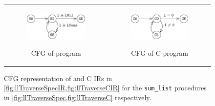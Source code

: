\begin{figure}
\begin{tabular}{@{}c@{}c@{}}
\begin{subfigure}[b]{0.5\textwidth}
\begin{center}
{\includegraphics[scale=1.4]{chapters/figures/figSumListSpecCfg.pdf}}
\end{center}
\caption{\label{fig:llTraverseSpecCFG}CFG of \SpecL{} program}
\end{subfigure}%
&
\begin{subfigure}[b]{0.5\textwidth}
\begin{center}
{\includegraphics[scale=1.4]{chapters/figures/figSumListCCfg.pdf}}
\end{center}
\caption{\label{fig:llTraverseCCFG}CFG of C program}
\end{subfigure}%
\\
\end{tabular}
\caption{\label{fig:llTraverseSpecAndCCFG}CFG representation of \SpecL{} and C IRs in \cref{fig:llTraverseSpecIR,fig:llTraverseCIR} for the {\tt sum\_list} procedures in \cref{fig:llTraverseSpec,fig:llTraverseC} respectively.}
\end{figure}
